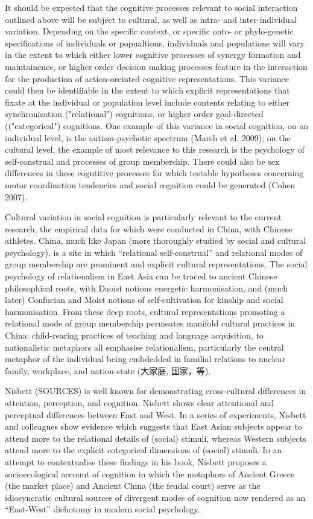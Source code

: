 \documentclass[12pt]{report}
\begin{document}

It should be expected that the cognitive processes relevant to social interaction outlined above will be subject to cultural, as well as intra- and inter-individual variation. Depending on the specific context, or specific onto- or phylo-genetic specifications of individuals or popualtions, individuals and populations will vary in the extent to which either lower cognitive processes of synergy formation and maintainence, or higher order decision making processes feature in the interaction for the production of action-oreinted cognitive representations.  This variance could then be identifiable in  the extent to which explicit representations that fixate at the individual or population level include contents relating to either synchronisation ("relational") cognitions, or higher order goal-directed (("categorical") cognitions.  One example of this variance in social cognition, on an individual level, is the autism-psychotic spectrum (Marsh et al. 2009); on the cultural level, the example of most relevance to this research is the psychology of self-construal and processes of group membership. There could also be sex differences in these cogntitive processes for which testable hypotheses concerning motor coordination tendencies and social cognition could be generated (Cohen 2007).

Cultural variation in social cognition is particularly relevant to the current research, the empirical data for which were conducted in China, with Chinese athletes.  China, much like Japan (more thoroughly studied by social and cultural psychology), is a site in which ``relational self-construal'' and relational modes of group membership are prominent and explicit cultural representations. The social psychology of relationalism in East Asia can be traced to ancient Chinese philosophical roots, with Daoist notions energetic harmonisation, and (much later) Confucian and Moist notions of self-cultivation for kinship and social harmonisation.  From these deep roots, cultural representations promoting a relational mode of group membership permeates manifold cultural practices in China: child-rearing practices of teaching and language acquisition, to nationalistic metaphors all emphasise relationalism, particularly the central metaphor of the individual being embdedded in familial relations to nuclear family, workplace, and nation-state (大家庭, 国家，等).

Nisbett (SOURCES) is well known for demonstrating cross-cultural differences in attention, perception, and cognition.  Nisbett shows clear attentional and perceptual differences between East and West. In a series of experiments, Nisbett and colleagues show evidence which suggests that East Asian subjects appear to attend more to the relational details of (social) stimuli, whereas Western subjects attend more to the explicit cotegorical dimensions of (social) stimuli.  In an attempt to contextualise these findings in his book, Nisbett proposes a socioecological account of cognition in which the metaphors of Ancient Greece (the market place) and Ancient China (the feudal court) serve as the idiosyncratic cultural sources of divergent modes of cognition now rendered as an ``East-West'' dichotomy in modern social psychology.
\end{document}
